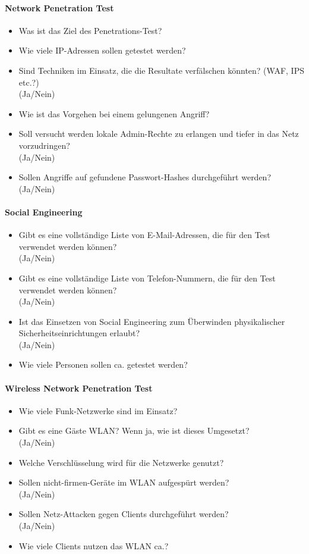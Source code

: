 \paragraph{Network Penetration Test}
\begin{itemize}
	\item Was ist das Ziel des Penetrations-Test?
	\item Wie viele IP-Adressen sollen getestet werden?
	\item Sind Techniken im Einsatz, die die Resultate verfälschen könnten? (WAF, IPS etc.?)\\
	(Ja/Nein)
	\item Wie ist das Vorgehen bei einem gelungenen Angriff?
	\item Soll versucht werden lokale Admin-Rechte zu erlangen und tiefer in das Netz vorzudringen?\\
	(Ja/Nein)
	\item Sollen Angriffe auf gefundene Passwort-Hashes durchgeführt werden?\\
	(Ja/Nein)
\end{itemize}

\paragraph{Social Engineering}
\begin{itemize}
	\item Gibt es eine vollständige Liste von E-Mail-Adressen, die für den Test verwendet werden können?\\
	(Ja/Nein)
	\item Gibt es eine vollständige Liste von Telefon-Nummern, die für den Test verwendet werden können?\\
	(Ja/Nein)
	\item Ist das Einsetzen von Social Engineering zum Überwinden physikalischer Sicherheitseinrichtungen erlaubt?\\
	(Ja/Nein)
	\item Wie viele Personen sollen ca. getestet werden?
\end{itemize}

\paragraph{Wireless Network Penetration Test}
\begin{itemize}
	\item Wie viele Funk-Netzwerke sind im Einsatz?
	\item Gibt es eine Gäste WLAN? Wenn ja, wie ist dieses Umgesetzt?\\
	(Ja/Nein)
	\item Welche Verschlüsselung wird für die Netzwerke genutzt?
	\item Sollen nicht-firmen-Geräte im WLAN aufgespürt werden?\\
	(Ja/Nein)
	\item Sollen Netz-Attacken gegen Clients durchgeführt werden?\\
	(Ja/Nein)
	\item Wie viele Clients nutzen das WLAN ca.?
\end{itemize}

